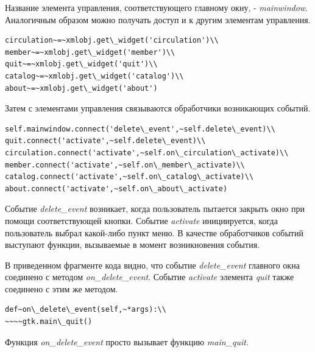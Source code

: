 \documentclass[a4paper,openany,twoside,draft]{book}
\providecommand*{\DUroletitlereference}[1]{\textsl{#1}}
\begin{document}
Название элемента управления, соответствующего главному окну, -
\DUroletitlereference{mainwindow}.  Аналогичным образом можно получать доступ и к другим
элементам управления.

\begin{verbatim}
circulation~=~xmlobj.get\_widget('circulation')\\
member~=~xmlobj.get\_widget('member')\\
quit~=~xmlobj.get\_widget('quit')\\
catalog~=~xmlobj.get\_widget('catalog')\\
about~=~xmlobj.get\_widget('about')
\end{verbatim}

Затем с элементами управления связываются обработчики возникающих
событий.

\begin{verbatim}
self.mainwindow.connect('delete\_event',~self.delete\_event)\\
quit.connect('activate',~self.delete\_event)\\
circulation.connect('activate',~self.on\_circulation\_activate)\\
member.connect('activate',~self.on\_member\_activate)\\
catalog.connect('activate',~self.on\_catalog\_activate)\\
about.connect('activate',~self.on\_about\_activate)
\end{verbatim}

Событие \DUroletitlereference{delete\_event} возникает, когда пользователь пытается закрыть
окно при помощи соответствующей кнопки.  Событие \DUroletitlereference{activate}
инициируется, когда пользователь выбрал какой-либо пункт меню.  В
качестве обработчиков событий выступают функции, вызываемые в момент
возникновения события.

В приведенном фрагменте кода видно, что событие \DUroletitlereference{delete\_event}
главного окна соединено с методом \DUroletitlereference{on\_delete\_event}.  Событие
\DUroletitlereference{activate} элемента \DUroletitlereference{quit} также соединено с этим же методом.

\begin{verbatim}
def~on\_delete\_event(self,~*args):\\
~~~~gtk.main\_quit()
\end{verbatim}

Функция \DUroletitlereference{on\_delete\_event} просто вызывает функцию \DUroletitlereference{main\_quit}.
\end{document}
